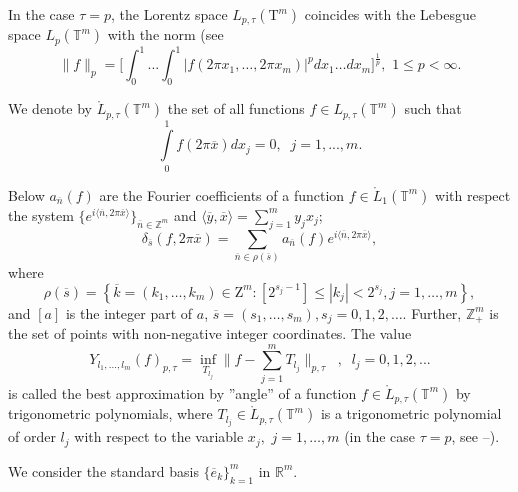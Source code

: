 \documentclass[12pt]{article}
\def\leq {\leqslant}
\theoremstyle{plain}
\begin{document}
In the case $\tau=p$, the Lorentz space $L_{p,\tau}(\mathrm{T}^{m})$ coincides with the Lebesgue space $L_{p}(\mathbb{T}^{m})$ with the norm (see \cite[Ch.~1, Sec.~1.1]{13}
\begin{equation*}
	\|f\|_{p} = \Biggl[\int_{0}^{1}...\int_{0}^{1}|f(2\pi x_{1},\dots, 2\pi x_{m})
	|^{p}dx_{1}\dots dx_{m}\Biggr]^{\frac{1}{p}}, \,\, 1\leq p<\infty.
\end{equation*}

We denote by ${\mathring L}_{p, \tau}(\mathbb{T}^{m})$  the set of all functions $f\in
L_{p, \tau}(\mathbb{T}^{m})$
such that
\begin{equation*}
\int\limits_{0}^{1}f(2\pi \overline{x}) dx_{j}  =0,\;\;
j=1,...,m .
\end{equation*}

Below $a_{\overline{n}}(f)$ are the Fourier coefficients of a function $f\in {\mathring L}_{1}\left(\mathbb{T}^{m} \right)$ with respect  the system $\{e^{i\langle\overline{n}, 2\pi\overline{x}\rangle}\}_{\overline{n}\in\mathbb{Z}^{m}}$ and $\langle\overline{y},\overline{x}\rangle=\sum\limits_{j=1}^{m}y_{j} x_{j}$;
$$
	\delta_{\overline{s}}(f, 2\pi\overline{x})
	= \sum\limits_{\overline{n} \in \rho \left( \overline{s} \right)}a_{\overline{n} }(f) e^{i\langle\overline{n}, 2\pi\overline{x}\rangle },
$$
where
$$
	\rho (\overline{s})=\left\{\overline{k} =\left( k_{1}, \dots, k_{m} \right) \in \mathrm{Z}^{m}\colon [2^{s_{j} -1}] \leq \left| k_{j} \right|<2^{s_{j} } ,j=1, \dots, m\right\},
$$
and $[a]$ is the integer part of $a$, $\overline{s} = (s_{1}, \dots, s_{m}), s_{j} = 0, 1, 2,\ldots$.
Further, $\mathbb{Z}_{+}^{m}$ is the set of points with non-negative integer coordinates.
The value
\begin{equation*}
Y_{l_{1},\ldots,l_{m}}(f)_{p, \tau} = \inf_{T_{l_{j}}} \|f-\sum_{j=1}^{m}T_{l_{j}}\|_{p, \tau} \;\;,\;\; l_{j} = 0,1,2,...
\end{equation*}
is called the best approximation by ''angle'' of a function $f\in {\mathring L}_{p, \tau}(\mathbb{T}^{m})$ by trigonometric polynomials, where $T_{l_{j}} \in {\mathring L}_{p, \tau}(\mathbb{T}^{m})$ is a trigonometric polynomial of order $l_{j}$ with respect to the variable $x_{j}, \,\, j = 1,\ldots,m$ (in the case $\tau=p$, see  \cite{14}--\cite{17}).

We consider the standard basis $\{\overline{e}_{k}\}_{k=1}^{m}$ in $\mathbb{R}^{m}$.
\end{document}
